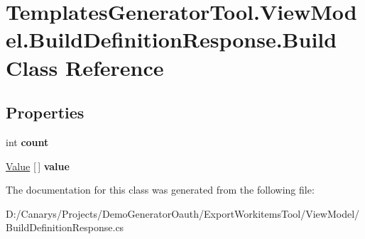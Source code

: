 \hypertarget{class_templates_generator_tool_1_1_view_model_1_1_build_definition_response_1_1_build}{}\section{Templates\+Generator\+Tool.\+View\+Model.\+Build\+Definition\+Response.\+Build Class Reference}
\label{class_templates_generator_tool_1_1_view_model_1_1_build_definition_response_1_1_build}
\subsection*{Properties}
\begin{DoxyCompactItemize}
\item 
\mbox{\label{class_templates_generator_tool_1_1_view_model_1_1_build_definition_response_1_1_build_a804ba35906a8d73f2712b5de4c606833}} 
int {\bfseries count}
\item 
\mbox{\label{class_templates_generator_tool_1_1_view_model_1_1_build_definition_response_1_1_build_ad8ff840185b0183f7caf9b5902776390}} 
\mbox{\hyperlink{class_templates_generator_tool_1_1_view_model_1_1_build_definition_response_1_1_value}{Value}} \mbox{[}$\,$\mbox{]} {\bfseries value}
\end{DoxyCompactItemize}


The documentation for this class was generated from the following file\+:\begin{DoxyCompactItemize}
\item 
D\+:/\+Canarys/\+Projects/\+Demo\+Generator\+Oauth/\+Export\+Workitems\+Tool/\+View\+Model/Build\+Definition\+Response.\+cs\end{DoxyCompactItemize}
